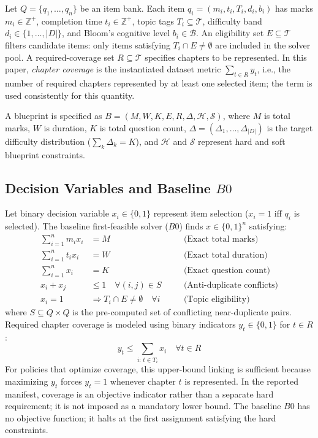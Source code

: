 \documentclass[runningheads]{llncs}
\begin{document}
Let $Q=\{q_1,\dots,q_n\}$ be an item bank. Each item $q_i=(m_i,t_i,T_i,d_i,b_i)$ has marks $m_i\in\mathbb{Z}^+$, completion time $t_i\in\mathbb{Z}^+$, topic tags $T_i\subseteq\mathcal{T}$, difficulty band $d_i\in\{1,\dots,|D|\}$, and Bloom's cognitive level $b_i\in\mathcal{B}$. An eligibility set $E\subseteq\mathcal{T}$ filters candidate items: only items satisfying $T_i\cap E\neq\emptyset$ are included in the solver pool. A required-coverage set $R\subseteq\mathcal{T}$ specifies chapters to be represented. In this paper, \emph{chapter coverage} is the instantiated dataset metric $\sum_{t\in R}y_t$, i.e., the number of required chapters represented by at least one selected item; the term is used consistently for this quantity.

A blueprint is specified as $B=(M,W,K,E,R,\Delta,\mathcal{H},\mathcal{S})$, where $M$ is total marks, $W$ is duration, $K$ is total question count, $\Delta=(\Delta_1,\dots,\Delta_{|D|})$ is the target difficulty distribution ($\sum_k\Delta_k=K$), and $\mathcal{H}$ and $\mathcal{S}$ represent hard and soft blueprint constraints.

\subsection{Decision Variables and Baseline $B0$}
Let binary decision variable $x_i\in\{0,1\}$ represent item selection ($x_i=1$ iff $q_i$ is selected). The baseline first-feasible solver ($B0$) finds $x\in\{0,1\}^n$ satisfying:
\begin{align}
\sum_{i=1}^n m_i x_i &= M \quad &&\text{(Exact total marks)} \label{eq:marks} \\
\sum_{i=1}^n t_i x_i &= W \quad &&\text{(Exact total duration)} \label{eq:time} \\
\sum_{i=1}^n x_i &= K \quad &&\text{(Exact question count)} \label{eq:count} \\
x_i + x_j &\le 1 \quad \forall (i,j)\in S \quad &&\text{(Anti-duplicate conflicts)} \label{eq:conflict} \\
x_i = 1 &\Rightarrow T_i\cap E\neq\emptyset \quad \forall i \quad &&\text{(Topic eligibility)} \label{eq:eligibility}
\end{align}
where $S\subseteq Q\times Q$ is the pre-computed set of conflicting near-duplicate pairs. Required chapter coverage is modeled using binary indicators $y_t\in\{0,1\}$ for $t\in R$:
\begin{equation}
y_t \le \sum_{i:\,t\in T_i} x_i \quad \forall t\in R \label{eq:coverage_link}
\end{equation}
For policies that optimize coverage, this upper-bound linking is sufficient because maximizing $y_t$ forces $y_t=1$ whenever chapter $t$ is represented. In the reported manifest, coverage is an objective indicator rather than a separate hard requirement; it is not imposed as a mandatory lower bound. The baseline $B0$ has no objective function; it halts at the first assignment satisfying the hard constraints.
\end{document}
